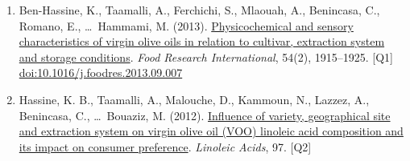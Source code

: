 \documentclass[10pt,a4paper]{article}
\newcommand{\doi}[1]{\href{https://doi.org/#1}{doi:#1}}
\newcommand{\Qu}[1]{[Q#1]}
\begin{document}
\begin{enumerate}[resume*]
\item Ben-Hassine, K., Taamalli, A., Ferchichi, S., Mlaouah, A., Benincasa, C., Romano, E., \ldots\ Hammami, M. (2013). \href{https://doi.org/10.1016/j.foodres.2013.09.007}{Physicochemical and sensory characteristics of virgin olive oils in relation to cultivar, extraction system and storage conditions}. \emph{Food Research International}, 54(2), 1915--1925. \Qu1 \doi{10.1016/j.foodres.2013.09.007}
\item Hassine, K. B., Taamalli, A., Malouche, D., Kammoun, N., Lazzez, A., Benincasa, C., \ldots\ Bouaziz, M. (2012). \href{https://www.researchgate.net/publication/288652330_Influence_of_variety_geographical_site_and_extraction_system_on_virgin_olive_oil_VOO_linoleic_acid_composition_and_its_impact_on_consumer_preference}{Influence of variety, geographical site and extraction system on virgin olive oil (VOO) linoleic acid composition and its impact on consumer preference}. \emph{Linoleic Acids}, 97. \Qu2


\end{enumerate}
\end{document}
